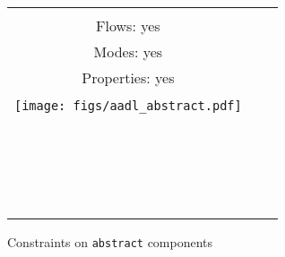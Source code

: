 {\begin{figure}[!h]
{\begin{tabular}{|c|l|l|}
{\begin{minipage}{0.3 \textwidth}
Connections: yes \\
Flows: yes \\
Modes: yes \\
Properties: yes\\
\end{minipage}
}
\\
\texttt{[image: figs/aadl\_abstract.pdf]}&& \\
&&\\
&&\\
&&\\
&&\\
&&\\
&&\\
&&\\
&&\\
&&\\
&&\\
&&\\
&&\\
&&\\
&&\\
&&\\
&&\\
&&\\
&&\\
&&\\
\hline
\end{tabular}
}
\caption{Constraints on \texttt{abstract} components}
\label{cons::abstract}
\end{figure}
}
